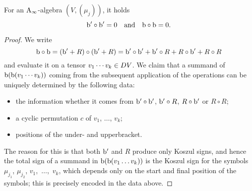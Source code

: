 \documentclass[\MainFolder/Text.tex]{subfiles}
\begin{document}
\begin{Lemma}[CP1] \label{Lem:CP1}
For an $\mathrm{A}_\infty$-algebra $(V,(\mu_j))$, it holds
\[ \mathrm{b}'\circ \mathrm{b}' = 0\quad\text{and}\quad \mathrm{b} \circ \mathrm{b} = 0. \]
\end{Lemma}
\begin{proof}
We write
\[ \mathrm{b}\circ\mathrm{b}  = (\mathrm{b}' + R)\circ(\mathrm{b}' + R) = \mathrm{b}'\circ \mathrm{b}' + \mathrm{b}' \circ R + R \circ \mathrm{b}' + R \circ R \]
and evaluate it on a tensor $v_1\dotsb v_k \in D V$. We claim that a summand of $\mathrm{b}(\mathrm{b}(v_1\dotsb v_k))$ coming from the subsequent application of the operations can be uniquely determined by the following data: 
\begin{itemize}
\item the information whether it comes from $\mathrm{b}'\circ \mathrm{b}'$, $\mathrm{b}'\circ R$, $R\circ \mathrm{b}'$ or $R\circ R$;
\item a cyclic permutation $c$ of $v_1$, $\dotsc$, $v_k$;
\item positions of the under- and upperbracket.
\end{itemize}
The reason for this is that both $\mathrm{b}'$ and $R$ produce only Koszul signs, and hence the total sign of a summand in $\mathrm{b}(\mathrm{b}(v_1\dots v_k))$ is the Koszul sign for the symbols $\mu_{j_1}$, $\mu_{j_2}$, $v_1$,~$\dotsc$,~$v_k$, which depends only on the start and final position of the symbols; this is precisely encoded in the data above.


\end{proof}
\end{document}
